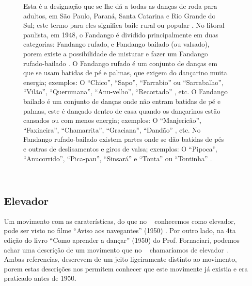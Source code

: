 \begin{figure}[t]
\begin{elaboracion}[title=Fandango]

Esta é a designação que se lhe dá a todas as danças de 
roda para adultos, em São Paulo, Paraná, Santa Catarina e Rio Grande do Sul;
este termo para eles significa baile rural ou popular \cite[pp. 261]{marcondes1977enciclopedia}.
No litoral paulista, em 1948, o Fandango é dividido principalmente em duas categorias: Fandango rufado, 
e Fandango bailado (ou valsado), porem existe a possibilidade de 
misturar e fazer um Fandango rufado-bailado \cite[pp. 48-49]{fandangoSP}.
O Fandango rufado é um conjunto de danças em que se usam batidas de pé e palmas, 
que exigem do dançarino muita energia; exemplos: O ``Chico'', ``Sapo'', 
``Farrabio'' ou ``Sarrabalho'', ``Vilão'', ``Querumana'', ``Anu-velho'', ``Recortado'' \cite[pp. 48-49]{fandangoSP}, 
etc.
O Fandango bailado é um conjunto de danças onde  não entram batidas de pé e palmas,
este é dançado dentro de casa quando os dançarinos estão cansados ou com menos energia;
exemplos: O ``Manjericão'', ``Faxineira'', ``Chamarrita'', ``Graciana'', ``Dandão'' \cite[pp. 49]{fandangoSP}, 
etc.
No Fandango rufado-bailado existem partes onde se dão batidas de pés e outras de deslisamentos e giros de valsa;
exemplos: O ``Pipoca'', ``Anucorrido'', ``Pica-pau'', ``Sinsará'' e ``Tonta'' ou ``Tontinha'' \cite[pp. 49]{fandangoSP}.


\end{elaboracion}
\label{fig:fandango}
\end{figure}
~\\



\subsection{Elevador}
\label{def:PassoElevador}

Um movimento com as caraterísticas, do que no \AnoLivro~ conhecemos como elevador, 
pode ser visto no filme ``Aviso aos navegantes'' (1950) \cite[min. 40:35]{AtlantidaDance}.
Por outro lado, na 4ta edição do livro ``Como aprender a dançar'' (1950) do Prof. Fornaciari,
podemos achar uma descrição de um movimento que no \AnoLivro~ chamaríamos de elevador \cite[pp. 161]{fornaciari1950aprender}.
Ambas referencias, descrevem de um jeito ligeiramente distinto ao movimento,
porem estas descrições nos permitem conhecer que este movimente já existia e era 
praticado antes de 1950.

